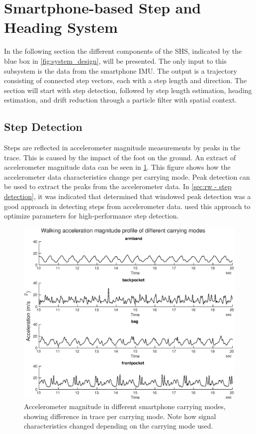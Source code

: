 \section{Smartphone-based Step and Heading System}
\label{sec:method-SHS}
In the following section the different components of the \ac{SHS}, indicated by the blue box in \cref{fig:system_design}, will be presented. The only input to this subsystem is the data from the smartphone IMU. The output is a trajectory consisting of connected step vectors, each with a step length and direction. The section will start with step detection, followed by step length estimation, heading estimation, and drift reduction through a particle filter with spatial context.

\subsection{Step Detection}
\label{sec:meth - step detection}

Steps are reflected in accelerometer magnitude measurements by peaks in the trace. This is caused by the impact of the foot on the ground. An extract of accelerometer magnitude data can be seen in \cref{fig:accelerometer_in_different_carrying_modes}. This figure shows how the accelerometer data characteristics change per carrying mode. Peak detection can be used to extract the peaks from the accelerometer data. In \cref{sec:rw - step detection}, it was indicated that \citet{Brajdic2013} determined that windowed peak detection was a good approach in detecting steps from accelerometer data. \citet{Salvi2018} used this approach to optimize parameters for high-performance step detection.

\begin{figure}[h]
	\centering
	\includegraphics[width=0.8\linewidth]{images/20201127_1110__frontpocket_}
	\caption{Accelerometer magnitude in different smartphone carrying modes, showing difference in trace per carrying mode. Note how signal characteristics changed depending on the carrying mode used.}
	\label{fig:accelerometer_in_different_carrying_modes}
\end{figure}
 

